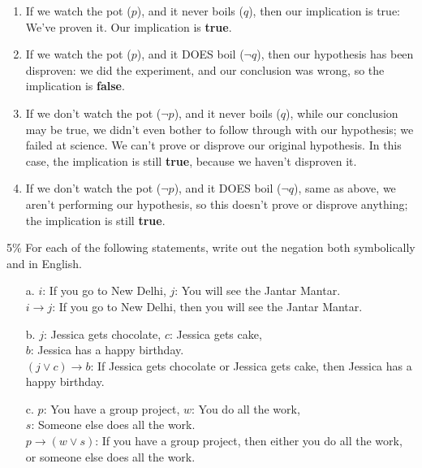 \documentclass[a4paper,12pt]{book}
\newcounter{question}
\begin{document}
\begin{introNOHEAD}
        \begin{enumerate}            
            \item If we watch the pot ($p$), and it never boils ($q$), then our implication is true:
                We've proven it. Our implication is \textbf{true}.
            \item If we watch the pot ($p$), and it DOES boil ($\neg q$), then our hypothesis has been disproven:
                we did the experiment, and our conclusion was wrong, so the implication is \textbf{false}.
            \item If we don't watch the pot ($\neg p$), and it never boils ($q$), while our conclusion
                may be true, we didn't even bother to follow through with our hypothesis; we failed at science.
                We can't prove or disprove our original hypothesis. In this case, the implication is
                still \textbf{true}, because we haven't disproven it.
            \item If we don't watch the pot ($\neg p$), and it DOES boil ($\neg q$), same as above,
                we aren't performing our hypothesis, so this doesn't prove or disprove anything;
                the implication is still \textbf{true}.
        \end{enumerate}
    \end{introNOHEAD}

    \newpage

        \begin{question}{\thequestion}{5\%}
            For each of the following statements, write out the negation
            both symbolically and in English.


            \begin{enumerate}
                \item[a.] $i$: If you go to New Delhi, $j$: You will see the Jantar Mantar. \\
                    $i \to j$: If you go to New Delhi, then you will see the Jantar Mantar.
                \item[b.]
                    $j$: Jessica gets chocolate,
                    $c$: Jessica gets cake, \\
                    $b$: Jessica has a happy birthday. \\
                    $(j \lor c) \to b$: If Jessica gets chocolate or Jessica gets cake, then Jessica has a happy birthday.
                \item[c.]
                    $p$: You have a group project, $w$: You do all the work, \\
                    $s$: Someone else does all the work. \\
                    $p \to (w \lor s)$: If you have a group project, then either you do all the work,
                        or someone else does all the work.
            \end{enumerate}
        \end{question}
\end{document}
